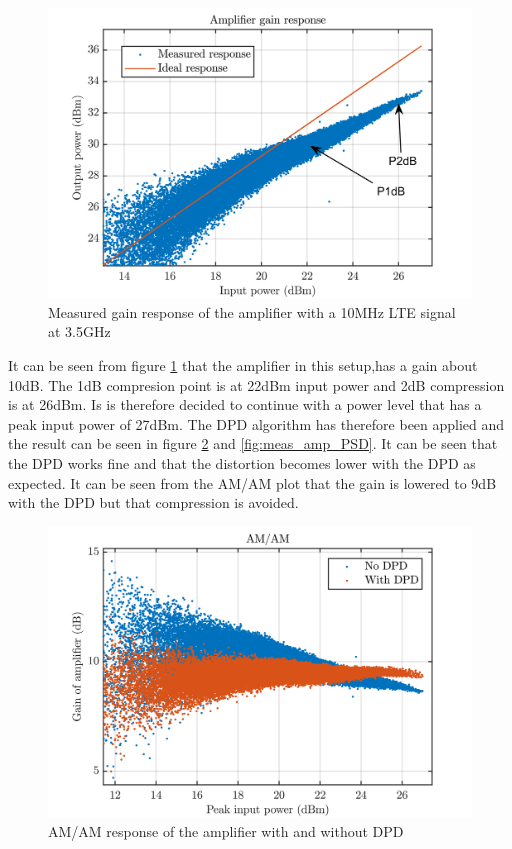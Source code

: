 \begin{figure}[H]
\centering 
\includegraphics[scale = 0.7]{figures/measurement/cree/meas1/gainResponse.png}
\caption{Measured gain response of the amplifier with a 10MHz LTE signal at 3.5GHz}
\label{fig:meas_amp_response}
\end{figure}

It can be seen from figure \ref{fig:meas_amp_response} that the amplifier in this setup,has a gain about 10dB. The 1dB compresion point is at 22dBm input power and 2dB compression is at 26dBm. Is is therefore decided to continue with a power level that has a peak input power of 27dBm. The DPD algorithm has therefore been applied and the result can be seen in figure \ref{fig:meas_amp_amam} and \ref{fig:meas_amp_PSD}. It can be seen that the DPD works fine and that the distortion becomes lower with the DPD as expected. It can be seen from the AM/AM plot that the gain is lowered to 9dB with the DPD but that compression is avoided. 

\begin{figure}[H]
\centering 
\includegraphics[scale = 0.7]{figures/measurement/cree/meas1/AMAM.png}
\caption{AM/AM response of the amplifier with and without DPD}
\label{fig:meas_amp_amam}
\end{figure}


